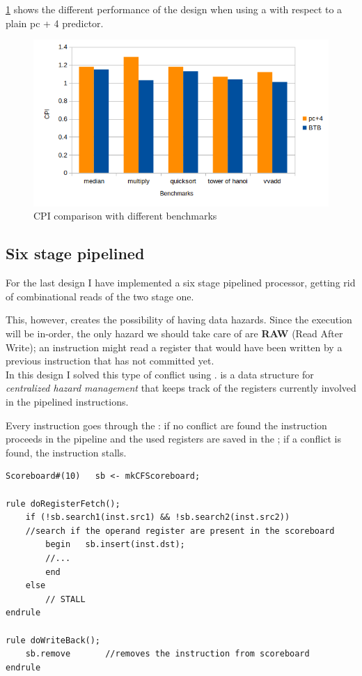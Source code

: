 \documentclass[12pt,oneside,a4paper]{article}
\begin{document}
\cref{btbbench} shows the different performance of the design when using a {\selectfont{BTB}} with respect to a plain pc + 4 predictor.

\begin{figure}[h]
	\centering
	\includegraphics[scale=0.7]{predbtb}
	\caption{CPI comparison with different benchmarks}
	\label{btbbench}
\end{figure}

\subsection{Six stage pipelined}
For the last design I have implemented a six stage pipelined processor, getting rid of combinational reads of the two stage one.

This, however, creates the possibility of having data hazards. Since the execution will be in-order, the only hazard we should take care of are \textbf{RAW} (Read After Write); an instruction might read a register that would have been written by a previous instruction that has not committed yet.\\

In this design I solved this type of conflict using {\selectfont{scoreboard}}. 
{\selectfont{Scoreboard}} is a data structure for \textit{centralized hazard management} that keeps track of the registers currently involved in the pipelined instructions. 

Every instruction goes through the {\selectfont{scoreboard}}: if no conflict are found the instruction proceeds in the pipeline and the used registers are saved in the  {\selectfont{scoreboard}}; if a conflict is found, the instruction stalls.

\begin{lstlisting}[label={fourcyclecode},caption={Scoreboard integration in the pipeline}]
Scoreboard#(10)   sb <- mkCFScoreboard;

rule doRegisterFetch();      
	if (!sb.search1(inst.src1) && !sb.search2(inst.src2))	
	//search if the operand register are present in the scoreboard
		begin	sb.insert(inst.dst);	
		//...
		end
	else
		// STALL
endrule

rule doWriteBack();
	sb.remove		//removes the instruction from scoreboard
endrule
\end{lstlisting}
\end{document}

